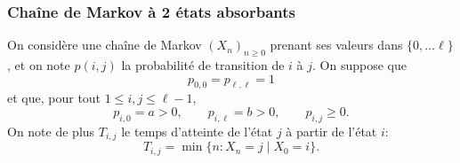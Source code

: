 \subsubsection{Chaîne de Markov à 2 états absorbants}

On considère une chaîne de Markov $(X_n)_{n \geq 0}$ prenant ses valeurs dans $\{0, \dots \ell\}$, et on note $p(i, j)$ la probabilité de transition de $i$ à $j$. On suppose que 
$$
p_{0, 0} = p_{\ell, \ell} = 1 
$$
et que, pour tout $1 \leq i, j \leq \ell-1$, 
$$
p_{i, 0} = a > 0, \qquad p_{i, \ell} = b > 0, \qquad p_{i, j} \geq 0.
$$
On note de plus $T_{i, j}$ le temps d'atteinte de l'état $j$ à partir de l'état $i$:
$$
T_{i, j} = \min\{n: X_n = j \mid X_0 = i\}.
$$

